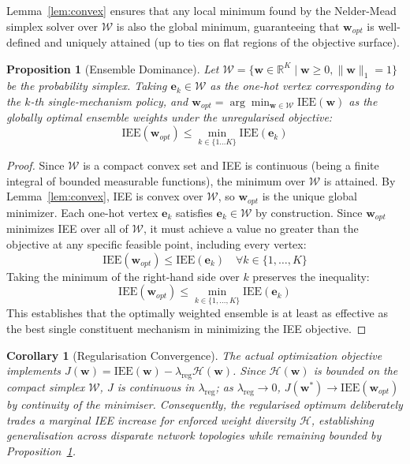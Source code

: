 \documentclass[review,12pt]{elsarticle}
\newtheorem{corollary}{Corollary}
\newtheorem{proposition}{Proposition}
\begin{document}
Lemma~\ref{lem:convex} ensures that any local minimum found by the Nelder-Mead simplex solver over $\mathcal{W}$ is also the global minimum, guaranteeing that $\mathbf{w}_{opt}$ is well-defined and uniquely attained (up to ties on flat regions of the objective surface).

\begin{proposition}[Ensemble Dominance]
\label{prop:dominance}
Let $\mathcal{W} = \{ \mathbf{w} \in \mathbb{R}^K \mid \mathbf{w} \ge 0, \|\mathbf{w}\|_1 = 1 \}$ be the probability simplex. Taking $\mathbf{e}_k \in \mathcal{W}$ as the one-hot vertex corresponding to the $k$-th single-mechanism policy, and $\mathbf{w}_{opt} = \arg\min_{\mathbf{w} \in \mathcal{W}} \text{IEE}(\mathbf{w})$ as the globally optimal ensemble weights under the unregularised objective:
\begin{equation}
    \text{IEE}(\mathbf{w}_{opt}) \le \min_{k \in \{1 \dots K\}} \text{IEE}(\mathbf{e}_k)
\end{equation}
\end{proposition}

\begin{proof}
Since $\mathcal{W}$ is a compact convex set and IEE is continuous (being a finite integral of bounded measurable functions), the minimum over $\mathcal{W}$ is attained. By Lemma~\ref{lem:convex}, IEE is convex over $\mathcal{W}$, so $\mathbf{w}_{opt}$ is the unique global minimizer. Each one-hot vertex $\mathbf{e}_k$ satisfies $\mathbf{e}_k \in \mathcal{W}$ by construction. Since $\mathbf{w}_{opt}$ minimizes IEE over all of $\mathcal{W}$, it must achieve a value no greater than the objective at any specific feasible point, including every vertex:
\begin{equation}
    \text{IEE}(\mathbf{w}_{opt}) \le \text{IEE}(\mathbf{e}_k) \quad \forall k \in \{1,\dots,K\}
\end{equation}
Taking the minimum of the right-hand side over $k$ preserves the inequality:
\begin{equation}
    \text{IEE}(\mathbf{w}_{opt}) \le \min_{k \in \{1,\dots,K\}} \text{IEE}(\mathbf{e}_k)
\end{equation}
This establishes that the optimally weighted ensemble is at least as effective as the best single constituent mechanism in minimizing the IEE objective.
\end{proof}

\begin{corollary}[Regularisation Convergence]
The actual optimization objective implements $J(\mathbf{w}) = \text{IEE}(\mathbf{w}) - \lambda_{\text{reg}}\mathcal{H}(\mathbf{w})$. Since $\mathcal{H}(\mathbf{w})$ is bounded on the compact simplex $\mathcal{W}$, $J$ is continuous in $\lambda_{\text{reg}}$; as $\lambda_{\text{reg}} \to 0$, $J(\mathbf{w}^*) \to \text{IEE}(\mathbf{w}_{opt})$ by continuity of the minimiser. Consequently, the regularised optimum deliberately trades a marginal IEE increase for enforced weight diversity $\mathcal{H}$, establishing generalisation across disparate network topologies while remaining bounded by Proposition~\ref{prop:dominance}.
\end{corollary}
\end{document}
